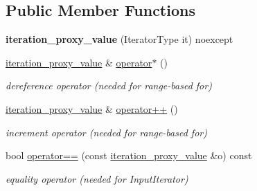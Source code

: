 \subsection*{Public Member Functions}
\begin{DoxyCompactItemize}
\item 
\mbox{\label{classnlohmann_1_1detail_1_1iteration__proxy__value_a459dd8961b80b2089d8161c9aa466581}} 
{\bfseries iteration\+\_\+proxy\+\_\+value} (Iterator\+Type it) noexcept
\item 
\mbox{\label{classnlohmann_1_1detail_1_1iteration__proxy__value_a10accadf05a172fdc69a016bec201e81}} 
\hyperlink{classnlohmann_1_1detail_1_1iteration__proxy__value}{iteration\+\_\+proxy\+\_\+value} \& \hyperlink{classnlohmann_1_1detail_1_1iteration__proxy__value_a10accadf05a172fdc69a016bec201e81}{operator$\ast$} ()
\begin{DoxyCompactList}\small\item\em dereference operator (needed for range-\/based for) \end{DoxyCompactList}\item 
\mbox{\label{classnlohmann_1_1detail_1_1iteration__proxy__value_adf4db2aef31822f3a179435158a4de11}} 
\hyperlink{classnlohmann_1_1detail_1_1iteration__proxy__value}{iteration\+\_\+proxy\+\_\+value} \& \hyperlink{classnlohmann_1_1detail_1_1iteration__proxy__value_adf4db2aef31822f3a179435158a4de11}{operator++} ()
\begin{DoxyCompactList}\small\item\em increment operator (needed for range-\/based for) \end{DoxyCompactList}\item 
\mbox{\label{classnlohmann_1_1detail_1_1iteration__proxy__value_af2b78a8b9c9276b07c928b21bb1e2d54}} 
bool \hyperlink{classnlohmann_1_1detail_1_1iteration__proxy__value_af2b78a8b9c9276b07c928b21bb1e2d54}{operator==} (const \hyperlink{classnlohmann_1_1detail_1_1iteration__proxy__value}{iteration\+\_\+proxy\+\_\+value} \&o) const
\begin{DoxyCompactList}\small\item\em equality operator (needed for Input\+Iterator) \end{DoxyCompactList}\item 

\end{DoxyCompactItemize}
